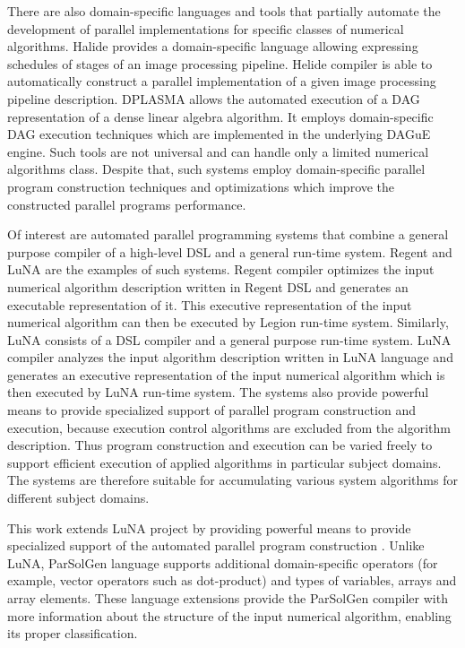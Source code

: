 \documentclass[conference]{IEEEtran}
\begin{document}
There are also domain-specific languages and tools that partially automate the development of parallel 
implementations for specific classes of numerical algorithms. Halide \cite{halide} provides a domain-specific language 
allowing expressing schedules of stages of an image processing pipeline. Helide compiler is able to 
automatically construct a parallel implementation of a given image processing pipeline description. 
DPLASMA \cite{dplasma} allows the automated execution of a DAG representation of a dense linear algebra algorithm. It 
employs domain-specific DAG execution techniques which are implemented in the underlying DAGuE \cite{dague} engine. 
Such tools are not universal and can handle only a limited numerical algorithms class. Despite that, 
such systems employ domain-specific parallel program construction techniques and optimizations which 
improve the constructed parallel programs performance.

Of interest are automated parallel programming systems that combine a general purpose compiler of 
a high-level DSL and a general run-time system. Regent \cite{regent. regent1} and LuNA \cite{luna} are the examples of such systems. 
Regent compiler optimizes the input numerical algorithm description written in Regent DSL and generates 
an executable representation of it. This executive representation of the input numerical algorithm can then 
be executed by Legion run-time system. Similarly, LuNA consists of a DSL compiler and a general purpose run-time system. LuNA compiler analyzes the input algorithm description written in LuNA language and generates an executive 
representation of the input numerical algorithm which is then executed by LuNA run-time system. The systems also provide powerful means to provide specialized support of parallel program construction and execution, because execution control algorithms are excluded from the algorithm description. Thus program construction and execution can be varied freely to support efficient execution of applied algorithms in particular subject domains. The systems are therefore suitable for accumulating various system algorithms for different subject domains. 

This work extends LuNA project by providing powerful means to provide specialized support of the automated parallel program construction \cite{luna1}.  Unlike LuNA, ParSolGen language supports additional domain-specific operators (for example, vector operators such as dot-product) and types of variables, arrays and array elements. These language extensions provide the ParSolGen compiler with more information 
about the structure of the input numerical algorithm, enabling its proper classification.
\end{document}
